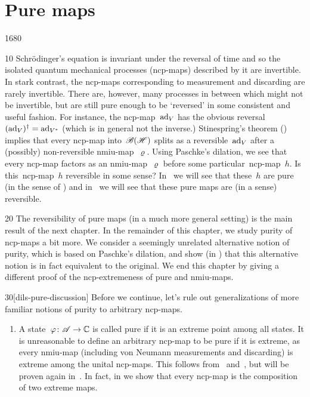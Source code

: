 \section{Pure maps}
\begin{parsec}{1680}%
\begin{point}{10}%
Schr\"odinger's equation is invariant under the reversal of time
    and so the isolated quantum mechanical processes (ncp-maps) described by
    it are invertible.
In stark contrast, the ncp-maps corresponding to measurement and discarding
    are rarely invertible.
There are, however, many  processes in between
    which might not be invertible, but are still pure enough to be `reversed'
        in some consistent and useful fashion.
For instance, the ncp-map~$\mathrm{ad}_V$
    has the obvious reversal~$(\mathrm{ad}_V)^\dagger = \mathrm{ad}_{V^*}$
        (which is in general not the inverse.)
    Stinespring's theorem ()
        implies that every ncp-map into~$\mathscr{B}(\mathscr{H})$
    splits as a reversible~$\mathrm{ad}_V$ after a (possibly) non-reversible
    nmiu-map~$\varrho$.
Using Paschke's dilation,
    we see that every ncp-map factors
    as an nmiu-map~$\varrho$ before some particular~ncp-map~$h$.
Is this~ncp-map~$h$ reversible in some sense?
In~ we will see that these~$h$
    are pure (in the sense of )
    and in~
    we will see that these pure maps are (in a sense) reversible.
\begin{point}{20}%
The reversibility of pure maps (in a much more general setting)
    is the main result of the next chapter.
In the remainder of this chapter, we study purity of ncp-maps a bit more.
We consider a seemingly unrelated  alternative notion of purity,
    which is based on Paschke's dilation,
    and show (in )
    that this alternative notion is in fact equivalent to the original.
We end this chapter by giving a different proof
    of the ncp-extremeness of pure and nmiu-maps.
\end{point}
\begin{point}{30}[dils-pure-discussion]%
Before we continue, let's rule out generalizations
    of more familiar notions of purity
    to arbitrary ncp-maps.
\begin{enumerate}
\item
A state~$\varphi\colon \mathscr{A} \to \mathbb{C}$ is called pure if it is an extreme
    point among all states.
It is unreasonable to define an arbitrary ncp-map to be pure
    if it is extreme, as every nmiu-map (including 
    von Neumann measurements and discarding)
    is extreme among the unital ncp-maps.
This follows from~ and~,
    but will be proven again in~.
In fact, in 
    we show that every ncp-map is the composition
    of two extreme maps.


\end{enumerate}
\end{point}
\end{point}
\end{parsec}
